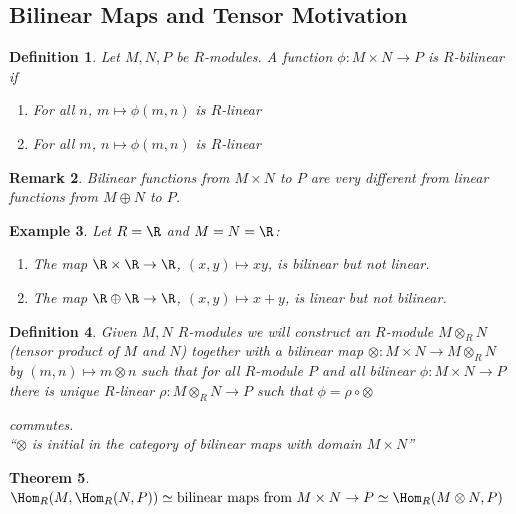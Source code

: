\documentclass[a4paper,12pt]{article}
\newtheorem{thm}{Theorem}[section]
\newtheorem{defn}[thm]{Definition}
\newtheorem{eg}[thm]{Example}
\newtheorem{rmk}[thm]{Remark}
\begin{document}
\subsection{Bilinear Maps and Tensor Motivation}
\begin{defn}
    Let $M,N,P$ be $R$-modules. A function $\phi:M\times N\to P$ is $R$-bilinear if 
    \begin{enumerate}
        \item For all $n$, $m\mapsto \phi(m,n)$ is $R$-linear
        \item For all $m$, $n\mapsto \phi(m,n)$ is $R$-linear
    \end{enumerate}
\end{defn}
\begin{rmk}
    Bilinear functions from $M\times N$ to $P$ are very different from linear functions from $M \oplus N$ to $P$. 
\end{rmk}
\begin{eg}
    Let $R=\R$ and $M=N=\R$:
    \begin{enumerate}
        \item The map $\R\times \R\to \R$, $(x,y)\mapsto xy$, is bilinear but not linear.
        \item The map $\R\oplus \R\to \R$, $(x,y)\mapsto x+y$, is linear but not bilinear.
    \end{enumerate}
\end{eg}
\begin{defn}
    Given $M,N$ $R$-modules we will construct an $R$-module $M\otimes_R N$ (tensor product of $M$ and $N$) together with a bilinear map $\otimes:M\times N\to M\otimes_R N$ by $(m,n)\mapsto m\otimes n$ such that for all $R$-module $P$ and all bilinear $\phi:M\times N\to P$ there is unique $R$-linear $\rho:M\otimes_R N\to P$ such that $\phi= \rho \circ \otimes$
    \begin{center}
    \end{center}
    commutes.\\
    ``$\otimes$ is initial in the category of bilinear maps with domain $M\times N$''
\end{defn}
\begin{thm}
    $\Hom_R(M,\Hom_R(N,P))\simeq \text{bilinear maps from } M\times N \to P\simeq \Hom_R(M\otimes N, P)$
\end{thm}
\newpage
\end{document}
